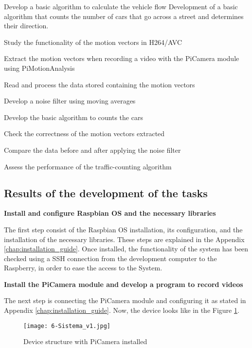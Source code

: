 {Develop a basic algorithm to calculate the vehicle flow}
{Development of a basic algorithm that counts the number of cars that go across a street and determines their direction.}
{	\item Study the functionality of the motion vectors in H264/AVC
	\item Extract the motion vectors when recording a video with the PiCamera module using PiMotionAnalysis
	\item Read and process the data stored containing the motion vectors
	\item Develop a noise filter using moving averages
	\item Develop the basic algorithm to counts the cars
}{	\item Check the correctness of the motion vectors extracted
	\item Compare the data before and after applying the noise filter
	\item Assess the performance of the traffic-counting algorithm
}


\subsection{Results of the development of the tasks}
\textbf{Install and configure Raspbian \ac{OS} and the necessary libraries}

The first step consist of the Raspbian \ac{OS} installation, its configuration, and the installation of the necessary libraries. These steps are explained in the Appendix \ref{chap:installation_guide}. Once installed, the functionality of the system has been checked using a SSH connection from the development computer to the Raspberry, in order to ease the access to the System. 

\textbf{Install the PiCamera module and develop a program to record videos}

The next step is connecting the PiCamera module and configuring it as stated in Appendix \ref{chap:installation_guide}. Now, the device looks like in the Figure \ref{fig:6-Sistema_v1}. 

\begin{figure}[!h]
	\begin{center}
		\texttt{[image: 6-Sistema\_v1.jpg]}
		\caption{Device structure with PiCamera installed}
		\label{fig:6-Sistema_v1}
	\end{center}
\end{figure}

